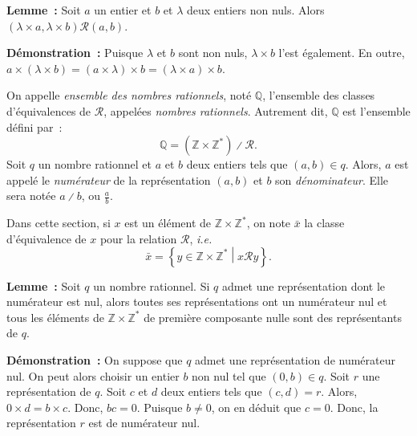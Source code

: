     \done

\medskip

\noindent\textbf{Lemme :} Soit $a$ un entier et $b$ et $\lambda$ deux entiers non nuls. 
    Alors $(\lambda \times a, \lambda \times b) \mathrel{\mathcal{R}} (a, b)$.

\medskip

\noindent\textbf{Démonstration :} Puisque $\lambda$ et $b$ sont non nuls, $\lambda \times b$ l'est également.
    En outre, $a \times (\lambda \times b) = (a \times \lambda) \times b = (\lambda \times a) \times b$.

    \done

\medskip

On appelle \emph{ensemble des nombres rationnels}, noté $\mathbb{Q}$, l'ensemble des classes d'équivalences de $\mathcal{R}$, appelées \emph{nombres rationnels}. 
 
Autrement dit, $\mathbb{Q}$ est l'ensemble défini par : 
\begin{equation*}
    \mathbb{Q} = (\mathbb{Z} \times \mathbb{Z}^*) \divslash \mathcal{R} .
\end{equation*}
Soit $q$ un nombre rationnel et $a$ et $b$ deux entiers tels que $(a, b) \in q$. 
Alors, $a$ est appelé le \emph{numérateur} de la représentation $(a, b)$ et $b$ son \emph{dénominateur}.
 
Elle sera notée $a \divslash b$, ou $\frac{a}{b}$.
\sindex[isy]{$\divslash$}

Dans cette section, si $x$ est un élément de $\mathbb{Z} \times \mathbb{Z}^*$, on note $\bar{x}$ la classe d'équivalence de $x$ pour la relation $\mathcal{R}$, \emph{i.e.}
\begin{equation*}
    \bar{x} = \left\lbrace y \in \mathbb{Z} \times \mathbb{Z}^* \middle\vert x \mathrel{\mathcal{R}} y \right\rbrace .
\end{equation*}

\medskip

\noindent\textbf{Lemme :} Soit $q$ un nombre rationnel. 
Si $q$ admet une représentation dont le numérateur est nul, alors toutes ses représentations ont un numérateur nul et tous les éléments de $\mathbb{Z} \times \mathbb{Z}^*$ de première composante nulle sont des représentants de $q$. 

\medskip

\noindent\textbf{Démonstration :} On suppose que $q$ admet une représentation de numérateur nul. 
    On peut alors choisir un entier $b$ non nul tel que $(0, b) \in q$. 
    Soit $r$ une représentation de $q$.
    Soit $c$ et $d$ deux entiers tels que $(c, d)  = r$.
    Alors, $0 \times d = b \times c$.
    Donc, $b c = 0$.
    Puisque $b \neq 0$, on en déduit que $c = 0$.
    Donc, la représentation $r$ est de numérateur nul.

